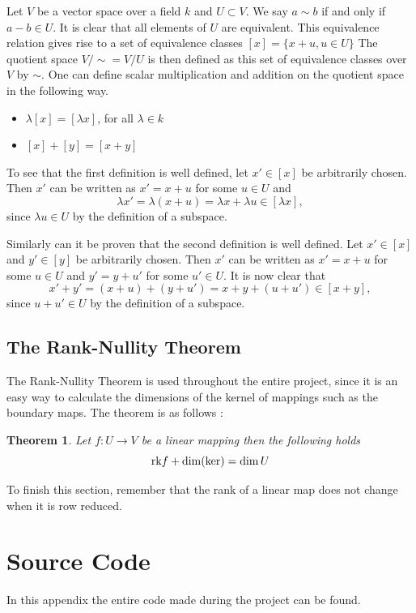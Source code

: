 \documentclass[11pt,a4paper,twoside]{report}
\newtheorem{mythm}{Theorem}[chapter]
\begin{document}
Let $V$ be a vector space over a field $k$ and $U\subset V$. We say $a\sim b$ if and only if $a-b\in U$. It is clear that all elements of $U$ are equivalent.
This equivalence relation gives rise to a set of equivalence classes $[x]=\{x+u,u\in U\}$
The quotient space $V/\sim = V/U$ is then defined as this set of equivalence classes over $V$ by $\sim$.
One can define scalar multiplication and addition on the quotient space in the following way. \cite{wikiQuo}
\begin{itemize}
\item $\lambda[x]=[\lambda x]$, for all $\lambda\in k$
\item $[x]+[y]=[x+y]$
\end{itemize}
To see that the first definition is well defined, let $x'\in[x]$ be arbitrarily chosen. Then $x'$ can be written as $x'=x+u$ for some $u\in U$ and 
\begin{equation*}
\lambda x' = \lambda (x + u) = \lambda x + \lambda u \in [\lambda x],
\end{equation*}
since $\lambda u \in U$ by the definition of a subspace.

Similarly can it be proven that the second definition is well defined. Let $x'\in[x]$ and $y'\in [y]$ be arbitrarily chosen. Then $x'$ can be written as $x'=x+u$ for some $u\in U$ and $y' = y+u'$ for some $u'\in U$. It is now clear that
\begin{equation*}
x'+y'=(x+u)+(y+u')=x+y+(u+u')\in [x+y],
\end{equation*}
since $u+u'\in U$ by the definition of a subspace.


\section{The Rank-Nullity Theorem}
The Rank-Nullity Theorem is used throughout the entire project, since it is an easy way to calculate the dimensions of the kernel of mappings such as the boundary maps. The theorem is as follows \cite[p. 109]{LinAlg}: 
\begin{mythm}\label{thm:rank_nullity}
Let $f:U\to V$ be a linear mapping then the following holds
\begin{equation*}
\textnormal{rk}f+\dim(\ker)=\dim U
\end{equation*}
\end{mythm}

To finish this section, remember that the rank of a linear map does not change when it is row reduced.

\chapter{Source Code}\label{ch:source_code}
In this appendix the entire code made during the project can be found.
\end{document}
